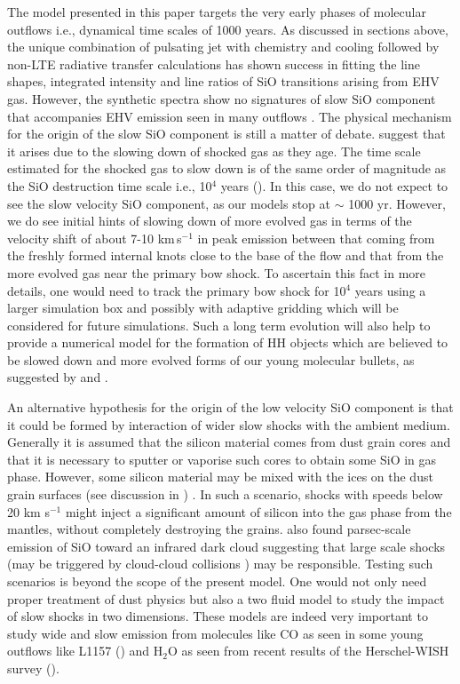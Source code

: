 \documentclass[useAMS,usenatbib]{mn2e}
\begin{document}
The model presented in this paper targets the very early phases of molecular
outflows i.e., dynamical time scales of 1000 years.
As discussed in sections above, the unique combination of pulsating
jet with chemistry and cooling followed by non-LTE radiative transfer
calculations has shown success in fitting the line shapes, integrated intensity and line ratios of SiO
transitions arising from EHV gas. However, the synthetic spectra show
no signatures of slow SiO component that accompanies EHV emission seen
in many outflows \citep[e.g.,][]{Lefloch:1998p13983,
  Codella:1999p12584}. 
The physical mechanism for the origin of the slow SiO component is still a matter
of debate. \cite{Codella:1999p12584} suggest that it arises due to the slowing down of
shocked gas as they age. The time scale estimated for the shocked gas
to slow down is of the same order of magnitude as the SiO destruction
time scale i.e., 10$^{4}$ years (\citealt{Codella:1999p12584}). In this
case, we do not expect to see the slow velocity SiO component, as our
models stop at $\sim$ 1000 yr. However, we do see initial 
hints of slowing down of more evolved gas in terms of the velocity
shift of about 7-10 km\,s$^{-1}$ in peak emission between that
coming from the freshly formed internal knots close to the base of the
flow and that from the more evolved gas near the
primary bow shock. To ascertain this fact in more details, one would
need to track the primary bow shock for 10$^{4}$ years
using a larger simulation box and possibly with adaptive gridding 
which will be considered for future simulations. Such a long term
evolution will also help to provide a numerical model for the formation of HH objects
which are believed to be slowed down and more evolved forms of our
young molecular bullets, as suggested by \cite{Norman:1979p14858} and
  \cite{Hartigan:1987p11178}.
%

An alternative hypothesis for the origin of the low velocity SiO
component is that it could be formed by interaction of wider slow
shocks with the ambient medium. Generally it is assumed that the silicon material comes from dust
grain cores and that it is necessary to sputter or vaporise such cores
to obtain some SiO in gas phase. However, some silicon material may be
mixed with the ices on the dust grain surfaces (see discussion in \citealt{Schilke:1997p14140}) . In such a scenario, 
shocks with speeds below 20 km s$^{-1}$ might inject a significant
amount of silicon into the gas phase from the mantles, without 
completely destroying the grains. \cite{JimenezSerra:2010p15530} also found parsec-scale emission of SiO
toward an infrared dark cloud suggesting that large scale shocks (may
be triggered by cloud-cloud collisions \citealt{Henshaw:2013p15540}) may
be responsible.
Testing such scenarios is beyond
the scope of the present model. One would not only need proper
treatment of dust physics but also a two fluid model to study the impact
of slow shocks in two dimensions. These models are indeed very
important to study wide and slow emission from molecules like CO 
as seen in some young outflows like L1157 (\citealt{GomezRuiz:2013p14549})
and H$_{2}$O as seen from recent results of the Herschel-WISH survey
(\citealt{Tafalla:2013p12586}).
\end{document}
